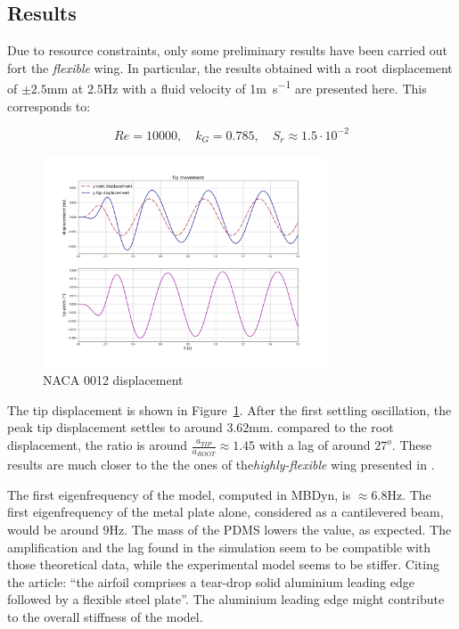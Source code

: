 \subsection{Results}

Due to resource constraints, only some preliminary results have been carried out fort the \textit{flexible} wing. In particular, the results obtained with a root displacement of $\pm2.5$\si{mm} at $2.5$\si{Hz} with a fluid velocity of 1\si{m.s^{-1}} are presented here. This corresponds to:

\begin{equation}
    Re=10000,\quad k_G = 0.785, \quad S_r \approx 1.5\cdot 10^{-2}
\end{equation}

\begin{figure}[ht!]
	\centering
	\includegraphics[width=0.75\textwidth]{images/heathcote/naca0012_disp.png}
	\caption{NACA 0012 displacement}
	\label{fig:hc-tip-disp}
\end{figure}

The tip displacement is shown in Figure~\ref{fig:hc-tip-disp}. After the first settling oscillation, the peak tip displacement settles to around $3.62$\si{mm}. compared to the root displacement, the ratio is around $\frac{a_{TIP}}{a_{ROOT}} \approx 1.45$ with a lag of around $27^o$. These results are much closer to the the ones of the\textit{highly-flexible} wing presented in \cite{heathcote2008effect}.

The first eigenfrequency of the model, computed in MBDyn, is $\approx6.8$\si{Hz}. The first eigenfrequency of the metal plate alone, considered as a cantilevered beam, would be around $9$\si{Hz}. The mass of the PDMS lowers the value, as expected. The amplification and the lag found in the simulation seem to be compatible with those theoretical data, while the experimental model seems to be stiffer. Citing the article: ``the airfoil comprises a tear-drop solid aluminium leading edge followed by a flexible steel plate''. The aluminium leading edge might contribute to the overall stiffness of the model.  

